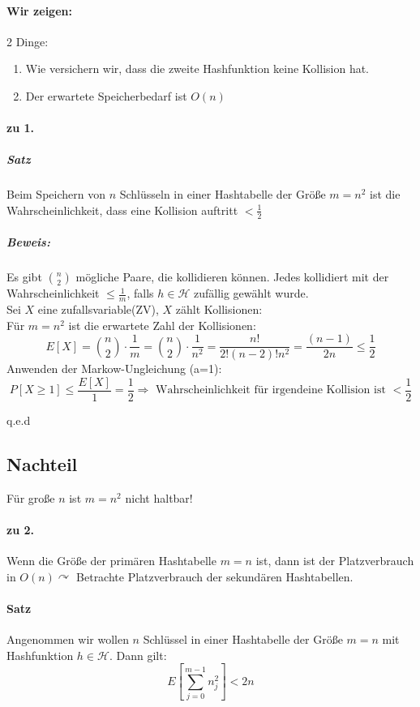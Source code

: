 \paragraph{Wir zeigen:} 2 Dinge:
\begin{enumerate}
	\item Wie versichern wir, dass die zweite Hashfunktion keine Kollision hat.
	\item Der erwartete Speicherbedarf ist $O(n)$
\end{enumerate}
\paragraph{zu 1.}
\subparagraph{Satz}
Beim Speichern von $n$ Schlüsseln in einer Hashtabelle der Größe $m=n^2$ ist die Wahrscheinlichkeit, dass eine Kollision auftritt $<\frac{1}{2}$
\subparagraph{Beweis:}
Es gibt $\binom{n}{2}$ mögliche Paare, die kollidieren können. Jedes kollidiert mit der Wahrscheinlichkeit $\leq \frac{1}{m}$, falls $h\in\mathcal{H}$ zufällig gewählt wurde.\\
Sei $X$ eine zufallsvariable(ZV), $X$ zählt Kollisionen:\\
Für $m=n^2$ ist die erwartete Zahl der Kollisionen:
\[ E[X]=\binom{n}{2}\cdot\frac{1}{m}=\binom{n}{2}\cdot\frac{1}{n^2}=\frac{n!}{2!(n-2)!n^2}=\frac{(n-1)}{2n}\leq\frac{1}{2} \]
Anwenden der Markow-Ungleichung (a=1):
\[ P[X\geq 1]\leq \frac{E[X]}{1}=\frac{1}{2} \Rightarrow \text{ Wahrscheinlichkeit für irgendeine Kollision ist } <\frac{1}{2} \]
\begin{flushright}
	q.e.d
	\end{flushright}
\subsection{Nachteil}
Für große $n$ ist $m=n^2$ nicht haltbar!
\paragraph{zu 2.}
Wenn die Größe der primären Hashtabelle $m=n$ ist, dann ist der Platzverbrauch in $O(n) \curvearrowright$ Betrachte Platzverbrauch der sekundären Hashtabellen.
\paragraph{Satz}
Angenommen wir wollen $n$ Schlüssel in einer Hashtabelle der Größe $m=n$ mit Hashfunktion $h\in \mathcal{H}$. Dann gilt:
\[ E\left[ \sum_{j=0}^{m-1} n_j^2 \right] <2n\]
